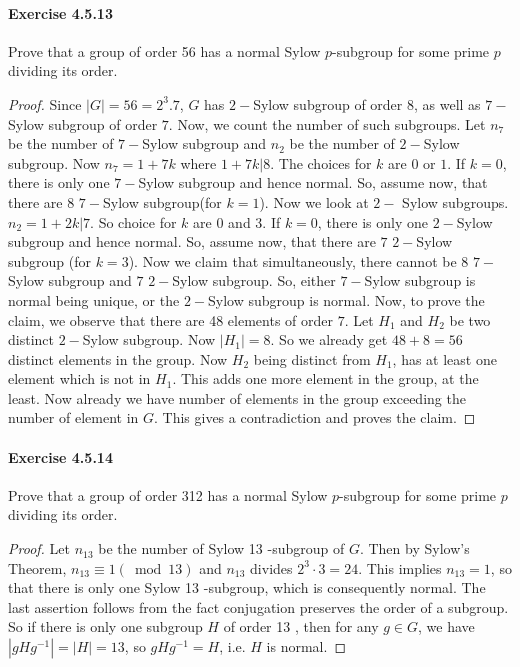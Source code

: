 \documentclass{article}
\theoremstyle{definition}
\begin{document}
\paragraph{Exercise 4.5.13} Prove that a group of order 56 has a normal Sylow $p$-subgroup for some prime $p$ dividing its order.
\begin{proof}    
Since $|G|=56=2^{3}.7$, $G$ has $2-$Sylow subgroup of order $8$, as well as $7-$Sylow subgroup of order $7$. Now, we count the number of such subgroups. Let $n_{7}$ be the number of  $7-$Sylow subgroup and $n_{2}$ be the number of  $2-$Sylow subgroup. Now $n_{7}=1+7k$ where $1+7k|8$. The choices for $k$ are $0$ or $1$. If $k=0$, there is only one $7-$Sylow subgroup and hence normal. So, assume now, that there are $8$ $7-$Sylow subgroup(for $k=1$). Now we look at $2-$ Sylow subgroups. $n_{2}=1+2k| 7$. So choice for $k$ are $0$ and $3$. If $k=0$, there is only one $2-$Sylow subgroup and hence normal. So, assume now, that there are $7$ $2-$Sylow subgroup (for $k=3$). Now we claim that simultaneously, there cannot be $8$ $7-$Sylow subgroup and $7$ $2-$Sylow subgroup. So, either $7-$Sylow subgroup is normal being unique, or  the $2-$Sylow subgroup is normal. Now, to prove the claim, we observe that there are 48 elements of order $7$. Let $H_{1}$ and $H_{2}$ be two distinct  $2-$Sylow subgroup. Now $|H_{1}|=8$. So we already get $48+8=56$ distinct elements in the group. Now $H_{2}$ being distinct from $H_{1}$, has at least one element which is not in $H_{1}$. This adds one more element in the group, at the least. Now already we have number of elements in the group exceeding the number of element in $G$. This gives a contradiction and proves the claim.
\end{proof}



\paragraph{Exercise 4.5.14} Prove that a group of order 312 has a normal Sylow $p$-subgroup for some prime $p$ dividing its order.
\begin{proof}
Let $n_{13}$ be the number of Sylow 13 -subgroup of $G$. Then by Sylow's Theorem, $n_{13} \equiv 1(\bmod 13)$ and $n_{13}$ divides $2^3 \cdot 3=24$. This implies $n_{13}=1$, so that there is only one Sylow 13 -subgroup, which is consequently normal. The last assertion follows from the fact conjugation preserves the order of a subgroup. So if there is only one subgroup $H$ of order 13 , then for any $g \in G$, we have $\left|g H g^{-1}\right|=|H|=13$, so $g H g^{-1}=H$, i.e. $H$ is normal.
\end{proof}
\end{document}
